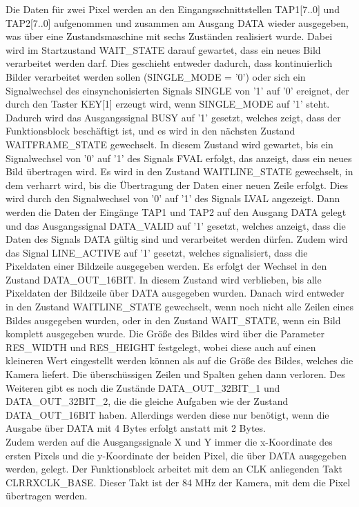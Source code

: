 \documentclass[ngerman,12pt]{article} %
\begin{document}
{Die Daten für zwei Pixel werden an den Eingangsschnittstellen TAP1[7..0] und TAP2[7..0] aufgenommen und zusammen am Ausgang DATA wieder ausgegeben, was über eine Zustandsmaschine mit sechs Zuständen realisiert wurde. Dabei wird im Startzustand WAIT\_STATE darauf gewartet, dass ein neues Bild verarbeitet werden darf. Dies geschieht entweder dadurch, dass kontinuierlich Bilder verarbeitet werden sollen (SINGLE\_MODE = '0') oder sich ein Signalwechsel des einsynchonisierten Signals SINGLE von '1' auf '0' ereignet, der durch den Taster KEY[1] erzeugt wird, wenn SINGLE\_MODE auf '1' steht. Dadurch wird das Ausgangssignal BUSY auf '1' gesetzt, welches zeigt, dass der Funktionsblock beschäftigt ist, und es wird in den nächsten Zustand WAITFRAME\_STATE gewechselt. In diesem Zustand wird gewartet, bis ein Signalwechsel von '0' auf '1' des Signals FVAL erfolgt, das anzeigt, dass ein neues Bild übertragen wird. Es wird in den Zustand WAITLINE\_STATE gewechselt, in dem verharrt wird, bis die Übertragung der Daten einer neuen Zeile erfolgt. Dies wird durch den Signalwechsel von '0' auf '1' des Signals LVAL angezeigt. Dann werden die Daten der Eingänge TAP1 und TAP2  auf den Ausgang DATA gelegt und das Ausgangssignal DATA\_VALID auf '1' gesetzt, welches anzeigt, dass die Daten des Signals DATA gültig sind und verarbeitet werden dürfen. Zudem wird das Signal LINE\_ACTIVE auf '1' gesetzt, welches signalisiert, dass die Pixeldaten einer Bildzeile ausgegeben werden. Es erfolgt der Wechsel in den Zustand DATA\_OUT\_16BIT. In diesem Zustand wird verblieben, bis alle Pixeldaten der Bildzeile über DATA ausgegeben wurden. Danach wird entweder in den Zustand WAITLINE\_STATE gewechselt, wenn noch nicht alle Zeilen eines Bildes ausgegeben wurden, oder in den Zustand WAIT\_STATE, wenn ein Bild komplett ausgegeben wurde. Die Größe des Bildes wird über die Parameter RES\_WIDTH und RES\_HEIGHT festgelegt, wobei diese auch auf einen kleineren Wert eingestellt werden können als auf die Größe des Bildes, welches die Kamera liefert. Die überschüssigen Zeilen und Spalten gehen dann verloren. Des Weiteren gibt es noch die Zustände DATA\_OUT\_32BIT\_1 und DATA\_OUT\_32BIT\_2, die die gleiche Aufgaben wie der Zustand DATA\_OUT\_16BIT haben. Allerdings werden diese nur benötigt, wenn die Ausgabe über DATA mit 4 Bytes erfolgt anstatt mit 2 Bytes.\\
Zudem werden auf die Ausgangssignale X und Y immer die x-Koordinate des ersten Pixels und die y-Koordinate der beiden Pixel, die über DATA ausgegeben werden, gelegt. Der Funktionsblock arbeitet mit dem an CLK anliegenden Takt CLRRXCLK\_BASE. Dieser Takt ist der 84 MHz der Kamera, mit dem die Pixel übertragen werden.



}
\end{document}
